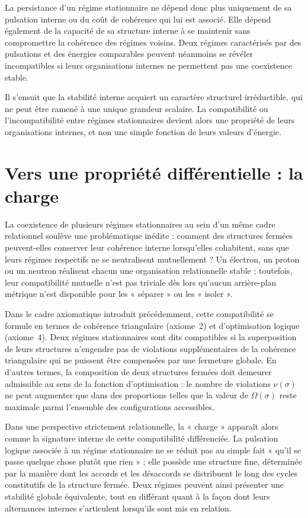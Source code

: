 \documentclass[11pt,a4paper]{article}
\begin{document}
La persistance d’un régime stationnaire ne dépend donc plus uniquement de sa pulsation interne ou du coût de cohérence qui lui est associé. Elle dépend également de la capacité de sa structure interne à se maintenir sans compromettre la cohérence des régimes voisins. Deux régimes caractérisés par des pulsations et des énergies comparables peuvent néanmoins se révéler incompatibles si leurs organisations internes ne permettent pas une coexistence stable.

Il s’ensuit que la stabilité interne acquiert un caractère structurel irréductible, qui ne peut être ramené à une unique grandeur scalaire. La compatibilité ou l’incompatibilité entre régimes stationnaires devient alors une propriété de leurs organisations internes, et non une simple fonction de leurs valeurs d’énergie.

\section{Vers une propriété différentielle : la charge}

La coexistence de plusieurs régimes stationnaires au sein d’un même cadre relationnel soulève une problématique inédite : comment des structures fermées peuvent-elles conserver leur cohérence interne lorsqu’elles cohabitent, sans que leurs régimes respectifs ne se neutralisent mutuellement ? Un électron, un proton ou un neutron réalisent chacun une organisation relationnelle stable ; toutefois, leur compatibilité mutuelle n’est pas triviale dès lors qu’aucun arrière-plan métrique n’est disponible pour les « séparer » ou les « isoler ».

Dans le cadre axiomatique introduit précédemment, cette compatibilité se formule en termes de cohérence triangulaire (axiome~2) et d’optimisation logique (axiome~4). Deux régimes stationnaires sont dits compatibles si la superposition de leurs structures n’engendre pas de violations supplémentaires de la cohérence triangulaire qui ne puissent être compensées par une fermeture globale. En d’autres termes, la composition de deux structures fermées doit demeurer admissible au sens de la fonction d’optimisation : le nombre de violations \(\nu\left(\sigma\right)\) ne peut augmenter que dans des proportions telles que la valeur de \(\Omega\left(\sigma\right)\) reste maximale parmi l’ensemble des configurations accessibles.

Dans une perspective strictement relationnelle, la « charge » apparaît alors comme la signature interne de cette compatibilité différenciée. La pulsation logique associée à un régime stationnaire ne se réduit pas au simple fait « qu’il se passe quelque chose plutôt que rien » ; elle possède une structure fine, déterminée par la manière dont les accords et les désaccords se distribuent le long des cycles constitutifs de la structure fermée. Deux régimes peuvent ainsi présenter une stabilité globale équivalente, tout en différant quant à la façon dont leurs alternances internes s’articulent lorsqu’ils sont mis en relation.
\end{document}
